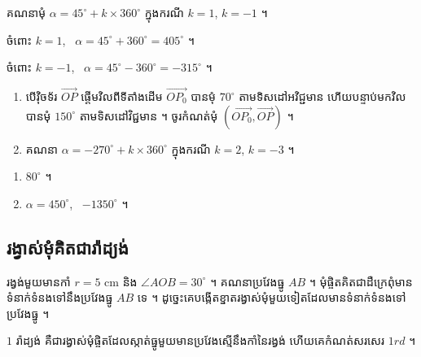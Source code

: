 \begin{example}[លំហាត់គំរូ ២]
គណនាមុំ $\alpha = 45^\circ + k \times 360^\circ$ ក្នុងករណី $k = 1$, $k = -1$ ។
\end{example}
\ans
ចំពោះ $k = 1$, \ $\alpha = 45^\circ + 360^\circ = 405^\circ$ ។

ចំពោះ $k = -1$, \ $\alpha = 45^\circ - 360^\circ = -315^\circ$ ។

\begin{pro}
\begin{enumerate}[1]
  \item បើវ៉ិចទ័រ $\overrightarrow{OP}$ ផ្តើមវិលពីទីតាំងដើម $\overrightarrow{OP_0}$ បានមុំ $70^\circ$ តាមទិសដៅអវិជ្ជមាន ហើយបន្ទាប់មកវិលបានមុំ $150^\circ$ តាមទិសដៅវិជ្ជមាន ។ ចូរកំណត់មុំ $(\overrightarrow{OP_0}, \overrightarrow{OP})$ ។
  \item គណនា $\alpha = -270^\circ + k \times 360^\circ$ ក្នុងករណី $k = 2$, $k = -3$ ។
\end{enumerate}
\ans
\begin{enumerate}[1]
  \item $80^\circ$ ។
  \item $\alpha = 450^\circ$, \ $-1350^\circ$ ។
\end{enumerate}
\end{pro}

\subsection{រង្វាស់មុំគិតជារ៉ាដ្យង់}

\begin{example}[ឧទាហរណ៍]
រង្វង់មួយមានកាំ $r = 5$ cm និង $\angle AOB = 30^\circ$ ។ គណនាប្រវែងធ្នូ $AB$ ។ មុំផ្ចិតគិតជាដឺក្រេពុំមានទំនាក់ទំនងទៅនឹងប្រវែងធ្នូ $AB$ ទេ ។ ដូច្នេះគេបង្កើតខ្នាតរង្វាស់មុំមួយទៀតដែលមានទំនាក់ទំនងទៅប្រវែងធ្នូ ។
\begin{center}
\end{center}
\end{example}

\begin{definition}
$1$ រ៉ាដ្យង់ គឺជារង្វាស់មុំផ្ចិតដែលស្កាត់ធ្នូមួយមានប្រវែងស្មើនឹងកាំនៃរង្វង់ ហើយគេកំណត់សរសេរ $1rd$ ។
\end{definition}

